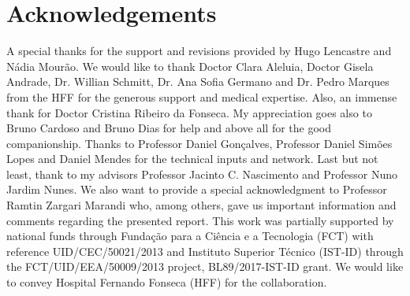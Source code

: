 
\section{Acknowledgements}
\label{sec:sec012}

A special thanks for the support and revisions provided by Hugo Lencastre and N\'{a}dia Mour\~{a}o.
We would like to thank Doctor Clara Aleluia, Doctor Gisela Andrade, Dr. Willian Schmitt, Dr. Ana Sofia Germano and Dr. Pedro Marques from the HFF for the generous support and medical expertise.
Also, an immense thank for Doctor Cristina Ribeiro da Fonseca.
My appreciation goes also to Bruno Cardoso and Bruno Dias for help and above all for the good companionship.
Thanks to Professor Daniel Gon\c{c}alves, Professor Daniel Sim\~{o}es Lopes and Daniel Mendes for the technical inputs and network.
Last but not least, thank to my advisors Professor Jacinto C. Nascimento and Professor Nuno Jardim Nunes.
We also want to provide a special acknowledgment to Professor Ramtin Zargari Marandi who, among others, gave us important information and comments regarding the presented report.
This work was partially supported by national funds through Funda\c{c}\~{a}o para a Ci\^{e}ncia e a Tecnologia (FCT) with reference UID/CEC/50021/2013 and Instituto Superior T\'{e}cnico (IST-ID) through the FCT/UID/EEA/50009/2013 project, BL89/2017-IST-ID grant.
We would like to convey Hospital Fernando Fonseca (HFF) for the collaboration.

